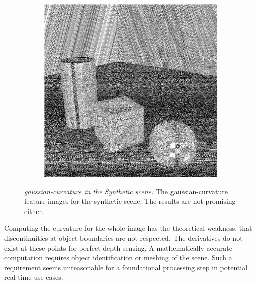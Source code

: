 \begin{figure}[tb]
\begin{subfigure}[t]{0.32\textwidth}
    \end{subfigure}
    \begin{subfigure}[t]{0.32\textwidth}
        \includegraphics[width=\linewidth]{chapter04/img/gauss-0210.png}
    \end{subfigure}
    \caption[\Gls{gaussian-curvature} in the \emph{Synthetic} scene]{\emph{\Gls{gaussian-curvature} in the Synthetic scene.} The \Gls{gaussian-curvature} feature images for the synthetic scene. The results are not promising either.}\label{fig:gaussian-curvature}
\end{figure}
Computing the curvature for the whole image has the theoretical weakness, that discontinuities at object boundaries are not respected.
The derivatives do not exist at these points for perfect depth sensing.
A mathematically accurate computation requires object identification or meshing of the scene.
Such a requirement seems unreasonable for a foundational processing step in potential real-time use cases.
